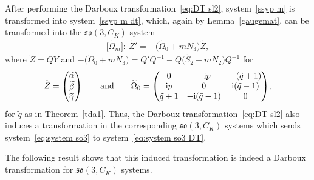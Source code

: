 \documentclass[pdftex]{sigma}%
\numberwithin{equation}{section}
\begin{document}
After performing the Darboux transformation~\eqref{eq:DT sl2}, system~\eqref{ssyp m} is transformed into system~\eqref{ssyp m dt}, which, again by Lemma~\ref{gaugemat}, can be transformed into the $\mathfrak{so}(3, C_K)$ system
\begin{gather}\label{eq:system so3 DT}
 \big[\widetilde{\Omega}_m\big]\colon\ \widetilde{Z}' = - \big(\widetilde{\Omega}_0 + m N_3 \big) \widetilde{Z},
\end{gather}
where $\widetilde{Z}= Q \widetilde{Y}$ and $- \big(\widetilde{\Omega}_0 + m N_3 \big) = Q' Q^{-1} - Q \big(\widetilde{S}_2 + m N_2\big) Q^{-1} $ for
\begin{gather*}
\widetilde{Z}= \begin{pmatrix} \widetilde{\alpha} \\ \widetilde{\beta} \\ \widetilde{\gamma} \end{pmatrix}
\qquad \text{and} \qquad
\widetilde{\Omega}_0=
\begin{pmatrix}
0&-{\rm i}p&-(\tilde{q}+1)\\ {\rm i}p&0&{\rm i}(\tilde{q}-1) \\ \tilde{q}+1&-{\rm i}(\tilde{q}-1)&0
\end{pmatrix}\!,
\end{gather*}
for $\tilde{q}$ as in Theorem~\ref{tda1}.
Thus, the Darboux transformation~\eqref{eq:DT sl2} also induces a transformation in the corresponding $\mathfrak{so}(3, C_K)$ systems which sends system~\eqref{eq:system so3} to system~\eqref{eq:system so3 DT}.

The following result shows that this induced transformation is indeed a Darboux transformation for $\mathfrak{so}(3, C_K)$ systems.
\end{document}

